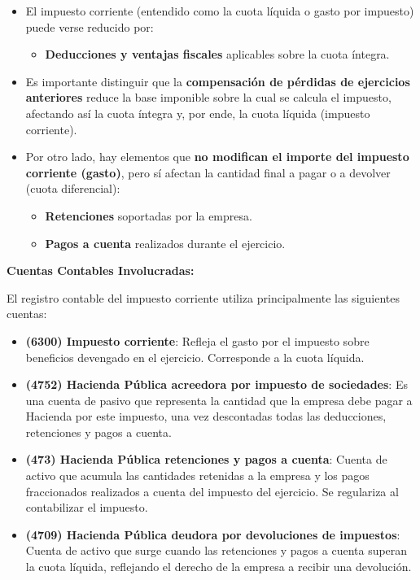 \documentclass[
  paper=a4,
  ,captions=tableheading
]{scrbook}
\providecommand{\tightlist}{%
  \setlength{\itemsep}{0pt}\setlength{\parskip}{0pt}}
\begin{document}
\begin{itemize}
\tightlist
\item
  El impuesto corriente (entendido como la cuota líquida o gasto por
  impuesto) puede verse reducido por:

  \begin{itemize}
  \tightlist
  \item
    \textbf{Deducciones y ventajas fiscales} aplicables sobre la cuota
    íntegra.
  \end{itemize}
\item
  Es importante distinguir que la \textbf{compensación de pérdidas de
  ejercicios anteriores} reduce la base imponible sobre la cual se
  calcula el impuesto, afectando así la cuota íntegra y, por ende, la
  cuota líquida (impuesto corriente).
\item
  Por otro lado, hay elementos que \textbf{no modifican el importe del
  impuesto corriente (gasto)}, pero sí afectan la cantidad final a pagar
  o a devolver (cuota diferencial):

  \begin{itemize}
  \tightlist
  \item
    \textbf{Retenciones} soportadas por la empresa.
  \item
    \textbf{Pagos a cuenta} realizados durante el ejercicio.
  \end{itemize}
\end{itemize}

\textbf{Cuentas Contables Involucradas:}

El registro contable del impuesto corriente utiliza principalmente las
siguientes cuentas:

\begin{itemize}
\tightlist
\item
  \textbf{(6300) Impuesto corriente}: Refleja el gasto por el impuesto
  sobre beneficios devengado en el ejercicio. Corresponde a la cuota
  líquida.
\item
  \textbf{(4752) Hacienda Pública acreedora por impuesto de sociedades}:
  Es una cuenta de pasivo que representa la cantidad que la empresa debe
  pagar a Hacienda por este impuesto, una vez descontadas todas las
  deducciones, retenciones y pagos a cuenta.
\item
  \textbf{(473) Hacienda Pública retenciones y pagos a cuenta}: Cuenta
  de activo que acumula las cantidades retenidas a la empresa y los
  pagos fraccionados realizados a cuenta del impuesto del ejercicio. Se
  regulariza al contabilizar el impuesto.
\item
  \textbf{(4709) Hacienda Pública deudora por devoluciones de
  impuestos}: Cuenta de activo que surge cuando las retenciones y pagos
  a cuenta superan la cuota líquida, reflejando el derecho de la empresa
  a recibir una devolución.
\end{itemize}
\end{document}
